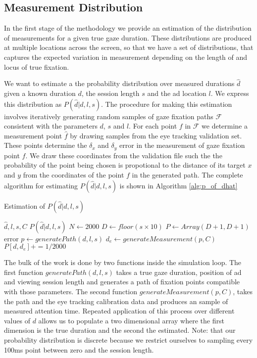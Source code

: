 \documentclass[12pt,a4paper]{article}
\numberwithin{equation}{section}
\begin{document}
\subsection{Measurement Distribution}

In the first stage of the methodology we provide an estimation of the distribution of 
measurements for a given true gaze duration. These distributions are produced at multiple locations
across the screen, so that we have a set of distributions, that captures the expected
variation in measurement depending on the length of and locus of true fixation.

We want to estimate a the probability distribution over measured durations $\hat{d}$ given a
known duration $d$, the session length $s$ and the ad location $l$. 
We express this distribution as $P(\hat{d}|d,l,s)$. The
procedure for making this estimation involves iteratively generating random samples
of gaze fixation paths $\mathcal{F}$ consistent with the parameters $d$, $s$ and $l$. 
For each point $f$ in $\mathcal{F}$ we determine a measurement point $\hat{f}$ 
by drawing samples from the eye tracking validation set. 
These points determine the $\delta_x$ and $\delta_y$ error in the measurement
of gaze fixation point $f$. We draw these coordinates from the validation file such the
the probability of the point being chosen is propotional to the distance of its target
$x$ and $y$ from the coordinates of the point $f$ in the generated path. The complete algorithm
for estimating $P(\hat{d}|d,l,s)$ is shown in Algorithm \ref{alg:p_of_dhat}    

\begin{algorithm}
\caption{Estimation of $P(\hat{d}|d,l,s)$}\label{alg:p_of_dhat}
\begin{algorithmic}
  \Require $\hat{d},l,s,C$
  \Ensure $P(\hat{d}|d,l,s)$
  \State $N \gets 2000$
  \State $D \gets floor(s \times 10)$ 
  \State $P \gets Array(D+1,D+1)$ 
    \State error
  \EndIf
   
     
      \State $p \gets generatePath(d,l,s)$
      \State $d_e \gets generateMeasurement(p,C)$  
      \State $P[d,d_e] += 1/2000$  
    \EndFor
  \EndFor
\end{algorithmic}
\end{algorithm}


The bulk of the work is done by two functions inside the simulation loop. The first function
$generatePath(d,l,s)$ takes a true gaze duration, position of ad and viewing session length and
generates a path of fixation points compatible with those parameters. The second function 
$generateMeasurement(p,C)$, takes the path and the eye tracking calibration data and produces
an sample of measured attention time. Repeated application of this process over different 
values of $d$ allows us to populate a two dimensional array where the first dimension is the
true duration and the second the estimated. Note: that our probability distribution is discrete
because we restrict ourselves to sampling every 100ms point between zero and the session length.
\end{document}
